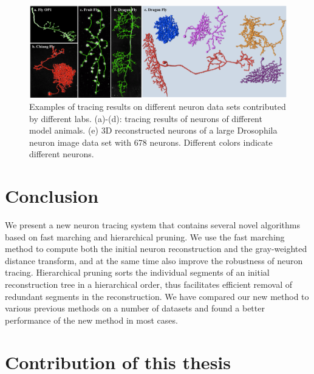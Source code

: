 \begin{figure}[htbp]
\centering
\includegraphics[width=1.0\textwidth]{images/autont_fig4}
\caption[Examples of tracing results on different neuron data sets contributed by different labs]{Examples of tracing results on different neuron data sets contributed by different labs. (a)-(d): tracing results of neurons of different model animals. (e) 3D reconstructed neurons of a large Drosophila neuron image data set with 678 neurons. Different colors indicate different neurons.}
\label{fig:autont-fig4}
\end{figure}

\section{Conclusion}
We present a new neuron tracing system that contains several novel algorithms based on fast marching and hierarchical pruning. We use the fast marching method to compute both the initial neuron reconstruction and the gray-weighted distance transform, and at the same time also improve the robustness of neuron tracing. Hierarchical pruning sorts the individual segments of an initial reconstruction tree in a hierarchical order, thus facilitates efficient removal of redundant segments in the reconstruction. We have compared our new method to various previous methods on a number of datasets and found a better performance of the new method in most cases. 

\section{Contribution of this thesis}
